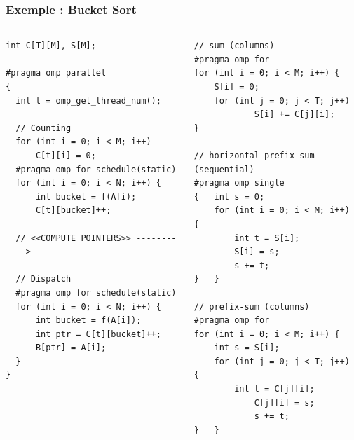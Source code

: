 \documentclass[xcolor={x11names,svgnames}]{beamer}
\begin{document}
\begin{frame}[label=radix_noconflict_table]
  \end{frame}


\begin{frame}[label=radix_code, fragile]
  \frametitle{Exemple : Bucket Sort}

  \begin{columns}
    \begin{column}{0.5\textwidth}
\begin{verbatim}
int C[T][M], S[M];

#pragma omp parallel
{
  int t = omp_get_thread_num();

  // Counting
  for (int i = 0; i < M; i++)
      C[t][i] = 0;
  #pragma omp for schedule(static)
  for (int i = 0; i < N; i++) {
      int bucket = f(A[i);
      C[t][bucket]++;

  // <<COMPUTE POINTERS>> ------------>

  // Dispatch
  #pragma omp for schedule(static)
  for (int i = 0; i < N; i++) {
      int bucket = f(A[i]);
      int ptr = C[t][bucket]++;
      B[ptr] = A[i];
  }
}
\end{verbatim}
    \end{column}  

    \begin{column}{5.8cm}
      \vspace{-0.7cm}
      \begin{verbatim}
// sum (columns)
#pragma omp for
for (int i = 0; i < M; i++) {
    S[i] = 0;
    for (int j = 0; j < T; j++)
            S[i] += C[j][i];
}

// horizontal prefix-sum (sequential)
#pragma omp single
{   int s = 0;
    for (int i = 0; i < M; i++) {
        int t = S[i];
        S[i] = s;
        s += t;
}   }

// prefix-sum (columns)
#pragma omp for
for (int i = 0; i < M; i++) {
    int s = S[i];
    for (int j = 0; j < T; j++) {
        int t = C[j][i];
            C[j][i] = s;
            s += t;
}   }
\end{verbatim}
    \end{column}
  \end{columns}
\end{frame}
\end{document}
